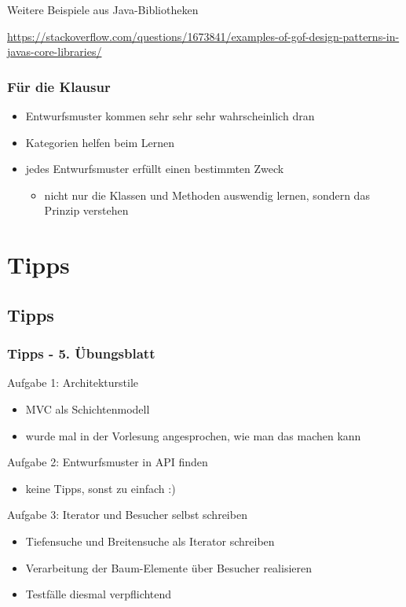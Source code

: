 \documentclass[18pt]{beamer}
\begin{document}
	\begin{frame}{Weitere Beispiele aus Java-Bibliotheken}
			\begin{center}
				\url{https://stackoverflow.com/questions/1673841/examples-of-gof-design-patterns-in-javas-core-libraries/}
			\end{center}
	\end{frame}
	
	\begin{frame}
		\frametitle{Für die Klausur}
		\begin{itemize}
			\item Entwurfsmuster kommen sehr sehr sehr wahrscheinlich dran \pause 
			\item Kategorien helfen beim Lernen \pause
			\item jedes Entwurfsmuster erfüllt einen bestimmten Zweck 
			\begin{itemize}
				\item nicht nur die Klassen und Methoden auswendig lernen, sondern das Prinzip verstehen
			\end{itemize}
		\end{itemize}
	\end{frame}


	
\section{Tipps}
	\subsection{Tipps}
	\begin{frame}
		\frametitle{Tipps - 5. Übungsblatt}
			\begin{exampleblock}{Aufgabe 1: Architekturstile} 
				\begin{itemize}
					\item MVC als Schichtenmodell
					\item wurde mal in der Vorlesung angesprochen, wie man das machen kann
				\end{itemize}
			\end{exampleblock}
			\pause
			\begin{exampleblock}{Aufgabe 2: Entwurfsmuster in API finden} 
				\begin{itemize}
					\item keine Tipps, sonst zu einfach :)
				\end{itemize}
			\end{exampleblock}
			\pause
			\begin{exampleblock}{Aufgabe 3: Iterator und Besucher selbst schreiben}
				\begin{itemize}
					\item Tiefensuche und Breitensuche als Iterator schreiben
					\item Verarbeitung der Baum-Elemente über Besucher realisieren
					\item Testfälle diesmal verpflichtend
				\end{itemize}
			\end{exampleblock}
	\end{frame}
\end{document}
